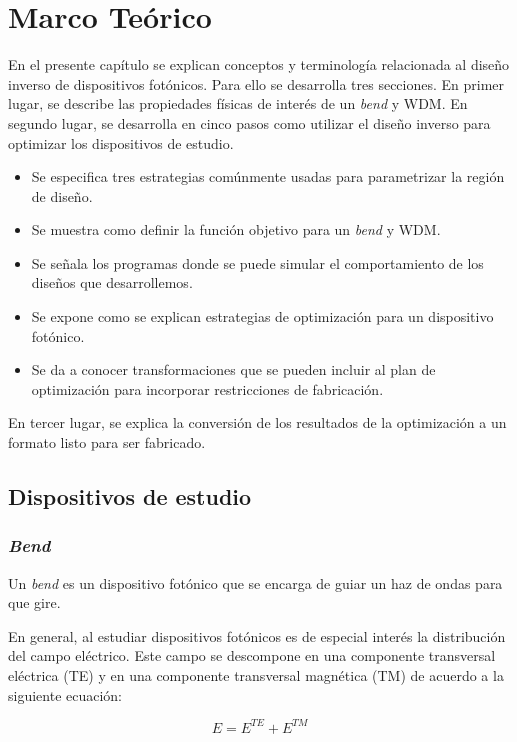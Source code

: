 \chapter{Marco  Teórico}

En el presente capítulo se explican conceptos y terminología relacionada al diseño inverso de dispositivos fotónicos.
Para ello se desarrolla tres secciones. 
En primer lugar, se describe las propiedades físicas de interés de un \emph{bend} y WDM.
En segundo lugar, se desarrolla en cinco pasos como utilizar el diseño inverso para optimizar los dispositivos de estudio.
  \begin{itemize}
  \item Se especifica tres estrategias comúnmente usadas para parametrizar la región de diseño.
  \item Se muestra como definir la función objetivo para un \emph{bend} y WDM.
  \item Se señala los programas donde se puede simular el comportamiento de los diseños que desarrollemos.
  \item Se expone como se explican estrategias de optimización para un dispositivo fotónico.
  \item Se da a conocer transformaciones que se pueden incluir al plan de optimización para incorporar restricciones de fabricación.
  \end{itemize}  
En tercer lugar, se explica la conversión de los resultados de la optimización a un formato listo para ser fabricado.


\section{Dispositivos de estudio}

\subsection{\emph{Bend}}

Un \emph{bend} es un dispositivo fotónico que se encarga de guiar un haz de ondas para que gire.

En general, al estudiar dispositivos fotónicos es de especial interés la distribución del campo eléctrico. 
Este campo se descompone en una componente transversal eléctrica (TE) y en una componente transversal magnética (TM) de acuerdo a la siguiente ecuación:

\begin{equation}
  E = E^{TE} + E^{TM}
\label{eq:field}
\end{equation}

